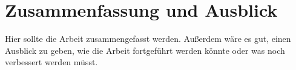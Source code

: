 

%
%
\chapter{Zusammenfassung und Ausblick}
\label{zusammen}


Hier sollte die Arbeit zusammengefasst werden. Außerdem wäre es gut, einen
Ausblick zu geben, wie die Arbeit fortgeführt werden könnte
oder was noch verbessert werden müsst. 




